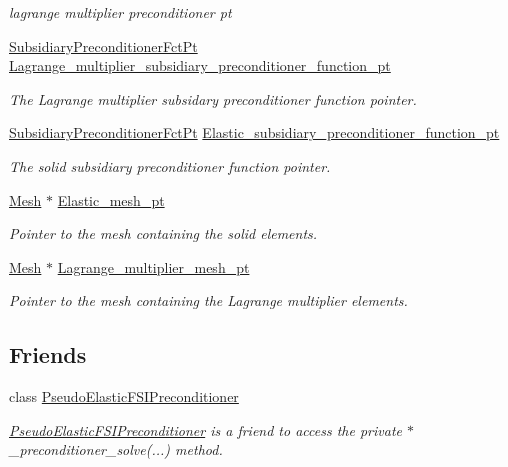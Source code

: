 \begin{DoxyCompactItemize}
\begin{DoxyCompactList}\small\item\em lagrange multiplier preconditioner pt \end{DoxyCompactList}\item 
\hyperlink{classoomph_1_1PseudoElasticPreconditionerOld_a8ee80a4a55139190a6e2a16fa175e75f}{Subsidiary\+Preconditioner\+Fct\+Pt} \hyperlink{classoomph_1_1PseudoElasticPreconditionerOld_ab010ad3548eec31d287215c63aad1abe}{Lagrange\+\_\+multiplier\+\_\+subsidiary\+\_\+preconditioner\+\_\+function\+\_\+pt}
\begin{DoxyCompactList}\small\item\em The Lagrange multiplier subsidary preconditioner function pointer. \end{DoxyCompactList}\item 
\hyperlink{classoomph_1_1PseudoElasticPreconditionerOld_a8ee80a4a55139190a6e2a16fa175e75f}{Subsidiary\+Preconditioner\+Fct\+Pt} \hyperlink{classoomph_1_1PseudoElasticPreconditionerOld_a48a6c1d213cabb8849b6abcad8415152}{Elastic\+\_\+subsidiary\+\_\+preconditioner\+\_\+function\+\_\+pt}
\begin{DoxyCompactList}\small\item\em The solid subsidiary preconditioner function pointer. \end{DoxyCompactList}\item 
\hyperlink{classoomph_1_1Mesh}{Mesh} $\ast$ \hyperlink{classoomph_1_1PseudoElasticPreconditionerOld_ab45147d893d104fbf3c0ebc0bacafc7d}{Elastic\+\_\+mesh\+\_\+pt}
\begin{DoxyCompactList}\small\item\em Pointer to the mesh containing the solid elements. \end{DoxyCompactList}\item 
\hyperlink{classoomph_1_1Mesh}{Mesh} $\ast$ \hyperlink{classoomph_1_1PseudoElasticPreconditionerOld_aee91427e4d8d57802728291d8576d5a4}{Lagrange\+\_\+multiplier\+\_\+mesh\+\_\+pt}
\begin{DoxyCompactList}\small\item\em Pointer to the mesh containing the Lagrange multiplier elements. \end{DoxyCompactList}\end{DoxyCompactItemize}
\subsection*{Friends}
\begin{DoxyCompactItemize}
\item 
class \hyperlink{classoomph_1_1PseudoElasticPreconditionerOld_aaaea2b4795566f81945597254305249d}{Pseudo\+Elastic\+F\+S\+I\+Preconditioner}
\begin{DoxyCompactList}\small\item\em \hyperlink{classoomph_1_1PseudoElasticFSIPreconditioner}{Pseudo\+Elastic\+F\+S\+I\+Preconditioner} is a friend to access the private $\ast$\+\_\+preconditioner\+\_\+solve(...) method. \end{DoxyCompactList}\end{DoxyCompactItemize}
